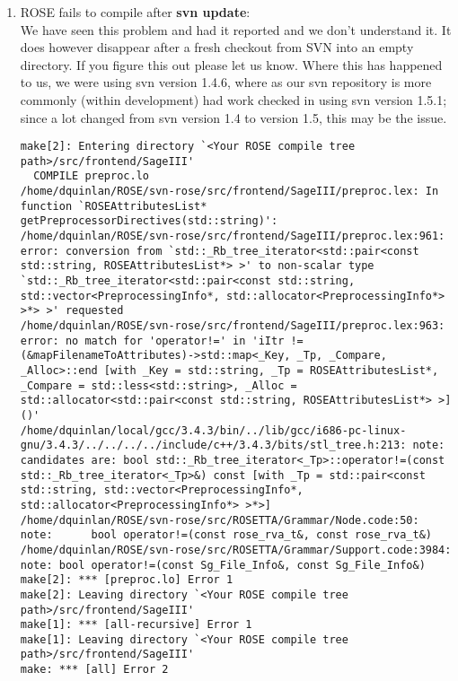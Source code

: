 \begin{enumerate}
   \item ROSE fails to compile after {\bf svn update}: \\
   We have seen this problem and had it reported and we don't understand it.
It does however disappear after a fresh checkout from SVN into an empty directory.
If you figure this out please let us know.  Where this has happened to us, we
were using svn version  1.4.6, where as our svn repository is more commonly
(within development) had work checked in using svn version 1.5.1; since a lot
changed from svn version 1.4 to version 1.5, this may be the issue.
{\scriptsize
\begin{verbatim}
make[2]: Entering directory `<Your ROSE compile tree path>/src/frontend/SageIII'
  COMPILE preproc.lo
/home/dquinlan/ROSE/svn-rose/src/frontend/SageIII/preproc.lex: In function `ROSEAttributesList* getPreprocessorDirectives(std::string)':
/home/dquinlan/ROSE/svn-rose/src/frontend/SageIII/preproc.lex:961: error: conversion from `std::_Rb_tree_iterator<std::pair<const std::string, ROSEAttributesList*> >' to non-scalar type `std::_Rb_tree_iterator<std::pair<const std::string, std::vector<PreprocessingInfo*, std::allocator<PreprocessingInfo*> >*> >' requested
/home/dquinlan/ROSE/svn-rose/src/frontend/SageIII/preproc.lex:963: error: no match for 'operator!=' in 'iItr != (&mapFilenameToAttributes)->std::map<_Key, _Tp, _Compare, _Alloc>::end [with _Key = std::string, _Tp = ROSEAttributesList*, _Compare = std::less<std::string>, _Alloc = std::allocator<std::pair<const std::string, ROSEAttributesList*> >]()'
/home/dquinlan/local/gcc/3.4.3/bin/../lib/gcc/i686-pc-linux-gnu/3.4.3/../../../../include/c++/3.4.3/bits/stl_tree.h:213: note: candidates are: bool std::_Rb_tree_iterator<_Tp>::operator!=(const std::_Rb_tree_iterator<_Tp>&) const [with _Tp = std::pair<const std::string, std::vector<PreprocessingInfo*, std::allocator<PreprocessingInfo*> >*>]
/home/dquinlan/ROSE/svn-rose/src/ROSETTA/Grammar/Node.code:50: note:      bool operator!=(const rose_rva_t&, const rose_rva_t&)
/home/dquinlan/ROSE/svn-rose/src/ROSETTA/Grammar/Support.code:3984: note: bool operator!=(const Sg_File_Info&, const Sg_File_Info&)
make[2]: *** [preproc.lo] Error 1
make[2]: Leaving directory `<Your ROSE compile tree path>/src/frontend/SageIII'
make[1]: *** [all-recursive] Error 1
make[1]: Leaving directory `<Your ROSE compile tree path>/src/frontend/SageIII'
make: *** [all] Error 2
\end{verbatim}
}

\end{enumerate}



